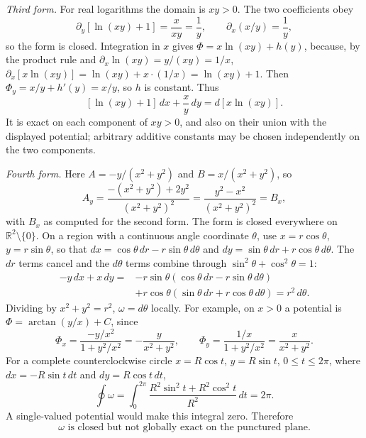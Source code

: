 \emph{Third form.} For real logarithms the domain is $xy>0$.
The two coefficients obey
\[
\partial_y[\ln(xy)+1]=\frac{x}{xy}=\frac1y,
\qquad \partial_x(x/y)=\frac1y,
\]
so the form is closed. Integration in $x$ gives
$\Phi=x\ln(xy)+h(y)$, because, by the product rule and
$\partial_x\ln(xy)=y/(xy)=1/x$,
$\partial_x[x\ln(xy)]=\ln(xy)+x\cdot(1/x)=\ln(xy)+1$. Then
$\Phi_y=x/y+h'(y)=x/y$, so $h$ is constant. Thus
\[
\boxed{[\ln(xy)+1]\,dx+\frac xy\,dy=d[x\ln(xy)]}.
\]
It is exact on each component of $xy>0$, and also on their union
with the displayed potential; arbitrary additive constants may be
chosen independently on the two components.

\emph{Fourth form.} Here $A=-y/(x^2+y^2)$ and
$B=x/(x^2+y^2)$, so
\[
A_y=\frac{-(x^2+y^2)+2y^2}{(x^2+y^2)^2}
=\frac{y^2-x^2}{(x^2+y^2)^2}=B_x,
\]
with $B_x$ as computed for the second form.
The form is closed everywhere on $\mathbb R^2\setminus\{0\}$.
On a region with a continuous angle coordinate $\theta$, use
$x=r\cos\theta$, $y=r\sin\theta$, so that
$dx=\cos\theta\,dr-r\sin\theta\,d\theta$ and
$dy=\sin\theta\,dr+r\cos\theta\,d\theta$. The $dr$ terms cancel and the
$d\theta$ terms combine through $\sin^2\theta+\cos^2\theta=1$:
\begin{align*}
-y\,dx+x\,dy
={}&-r\sin\theta(\cos\theta\,dr-r\sin\theta\,d\theta)\\
&+r\cos\theta(\sin\theta\,dr+r\cos\theta\,d\theta)
=r^2\,d\theta.
\end{align*}
Dividing by $x^2+y^2=r^2$, $\omega=d\theta$ locally. For example, on
$x>0$ a potential is
$\Phi=\arctan(y/x)+C$, since
\[
\Phi_x=\frac{-y/x^2}{1+y^2/x^2}=-\frac{y}{x^2+y^2},\qquad
\Phi_y=\frac{1/x}{1+y^2/x^2}=\frac{x}{x^2+y^2}.
\]
For a complete counterclockwise circle
$x=R\cos t$, $y=R\sin t$, $0\le t\le2\pi$, where
$dx=-R\sin t\,dt$ and $dy=R\cos t\,dt$,
\[
\oint\omega
=\int_0^{2\pi}\frac{R^2\sin^2t+R^2\cos^2t}{R^2}\,dt=2\pi.
\]
A single-valued potential would make this integral zero. Therefore
\[
\boxed{\omega\text{ is closed but not globally exact on the punctured plane}}.
\]


